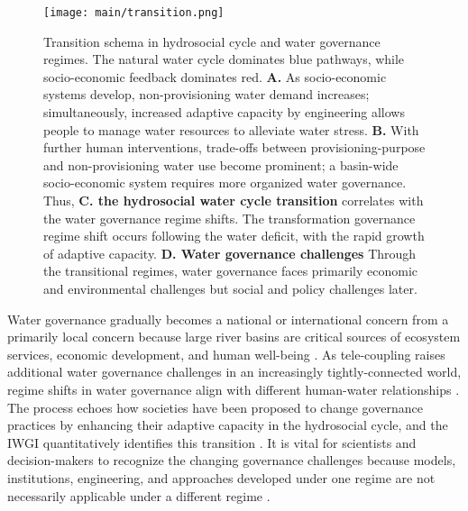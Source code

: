 \begin{figure*}[htbp!]
	\centering
	\texttt{[image: main/transition.png]}
	\caption{
		Transition schema in hydrosocial cycle and water governance regimes. The natural water cycle dominates blue pathways, while socio-economic feedback dominates red.
		\textbf{A.} As socio-economic systems develop, non-provisioning water demand increases; simultaneously, increased adaptive capacity by engineering allows people to manage water resources to alleviate water stress.
		\textbf{B.} With further human interventions, trade-offs between provisioning-purpose and non-provisioning water use become prominent; a basin-wide socio-economic system requires more organized water governance.
		Thus, \textbf{C. the hydrosocial water cycle transition} correlates with the water governance regime shifts. The transformation governance regime shift occurs following the water deficit, with the rapid growth of adaptive capacity.
		\textbf{D. Water governance challenges} Through the transitional regimes, water governance faces primarily economic and environmental challenges but social and policy challenges later.
	}
	\label{fig:summary}
\end{figure*}

Water governance gradually becomes a national or international concern from a primarily local concern because large river basins are critical sources of ecosystem services, economic development, and human well-being
\cite{best2019,best2020}.
As tele-coupling raises additional water governance challenges in an increasingly tightly-connected world, regime shifts in water governance align with different human-water relationships \cite{diaz2019}.
The process echoes how societies have been proposed to change governance practices by enhancing their adaptive capacity in the hydrosocial cycle, and the IWGI quantitatively identifies this transition \cite{loch2020,turton1999}.
It is vital for scientists and decision-makers to recognize the changing governance challenges because models, institutions, engineering, and approaches developed under one regime are not necessarily applicable under a different regime \cite{reyers2018}.

